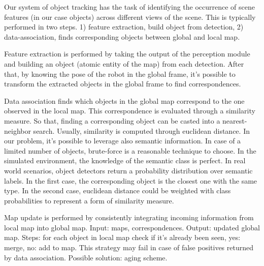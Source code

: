 \documentclass{article}
\begin{document}
	
	Our system of object tracking has the task of identifying the occurrence of scene features (in our case objects) across different views of the scene. This is typically performed in two steps. 1) feature extraction, build object from detection, 2) data-association, finds corresponding objects between global and local map.
	
	Feature extraction is performed by taking the output of the perception module and building an object (atomic entity of the map) from each detection. After that, by knowing the pose of the robot in the global frame, it's possible to transform the extracted objects in the global frame to find correspondences.
	
	Data association finds which objects in the global map correspond to the one observed in the local map. This correspondence is evaluated through a similarity measure. So that, finding a corresponding object can be casted into a nearest-neighbor search. Usually, similarity is computed through euclidean distance. In our problem, it's possible to leverage also semantic information. In case of a limited number of objects, brute-force is a reasonable technique to choose. In the simulated environment, the knowledge of the semantic class is perfect. In real world scenarios, object detectors return a probability distribution over semantic labels. In the first case, the corresponding object is the closest one with the same type. In the second case, euclidean distance could be weighted with class probabilities to represent a form of similarity measure.
	
	Map update is performed by consistently integrating incoming information from local map into global map. Input: maps, correspondences. Output: updated global map. Steps: for each object in local map check if it's already been seen, yes: merge, no: add to map. This strategy may fail in case of false positives returned by data association. Possible solution:  aging scheme.
		
	
	
	
	
	
\end{document}
